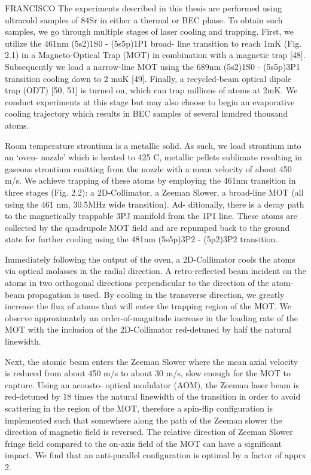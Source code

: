 FRANCISCO
The experiments described in this thesis are performed using ultracold samples of 84Sr in either a thermal or BEC phase. 
To obtain such samples, we go through multiple stages of laser cooling and trapping. 
First, we utilize the 461nm (5s2)1S0 - (5s5p)1P1 broad- line transition to reach 1mK (Fig. 2.1) in a Magneto-Optical Trap (MOT) in combination with a magnetic trap [48]. 
Subsequently we load a narrow-line MOT using the 689nm (5s2)1S0 - (5s5p)3P1 transition cooling down to 2 muK [49]. 
Finally, a recycled-beam optical dipole trap (ODT) [50, 51] is turned on, which can trap millions of atoms at 2mK. 
We conduct experiments at this stage but may also choose to begin an evaporative cooling trajectory which results in BEC samples of several hundred thousand atoms.

Room temperature strontium is a metallic solid. 
As such, we load strontium into an ‘oven- nozzle’ which is heated to 425 C, metallic pellets sublimate resulting in gaseous strontium emitting from the nozzle with a mean velocity of about 450 m/s. 
We achieve trapping of these atoms by employing the 461nm transition in three stages (Fig. 2.2): a 2D-Collimator, a Zeeman Slower, a broad-line MOT (all using the 461 nm, 30.5MHz wide transition). 
Ad- ditionally, there is a decay path to the magnetically trappable 3PJ manifold from the 1P1 line. 
These atoms are collected by the quadrupole MOT field and are repumped back to the ground state for further cooling using the 481nm (5s5p)3P2 - (5p2)3P2 transition.

Immediately following the output of the oven, a 2D-Collimator cools the atoms via optical molasses in the radial direction. 
A retro-reflected beam incident on the atoms in two orthogonal directions perpendicular to the direction of the atom-beam propagation is used. 
By cooling in the transverse direction, we greatly increase the flux of atoms that will enter the trapping region of the MOT. 
We observe approximately an order-of-magnitude increase in the loading rate of the MOT with the inclusion of the 2D-Collimator red-detuned by half the natural linewidth.

Next, the atomic beam enters the Zeeman Slower where the mean axial velocity is reduced from about 450 m/s to about 30 m/s, slow enough for the MOT to capture. 
Using an acousto- optical modulator (AOM), the Zeeman laser beam is red-detuned by 18 times the natural linewidth of the transition in order to avoid scattering in the region of the MOT, therefore a spin-flip configuration is implemented such that somewhere along the path of the Zeeman slower the direction of magnetic field is reversed. 
The relative direction of Zeeman Slower fringe field compared to the on-axis field of the MOT can have a significant impact. 
We find that an anti-parallel configuration is optimal by a factor of apprx 2.

